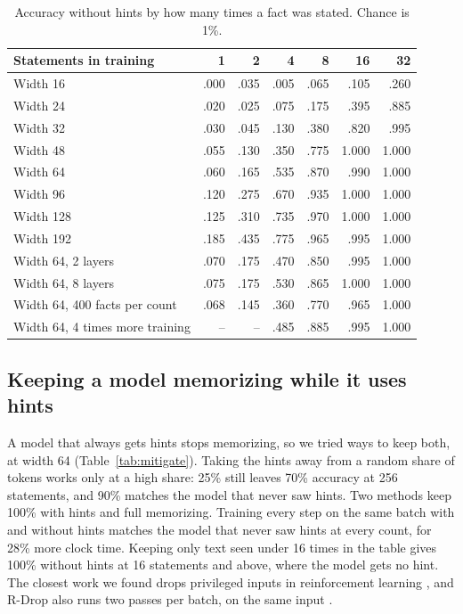 \documentclass[11pt]{article}
\begin{document}
\begin{table}[h]\centering\small
\begin{tabular}{lrrrrrr}\toprule
Statements in training & 1 & 2 & 4 & 8 & 16 & 32\\\midrule
Width 16 & .000 & .035 & .005 & .065 & .105 & .260\\
Width 24 & .020 & .025 & .075 & .175 & .395 & .885\\
Width 32 & .030 & .045 & .130 & .380 & .820 & .995\\
Width 48 & .055 & .130 & .350 & .775 & 1.000 & 1.000\\
Width 64 & .060 & .165 & .535 & .870 & .990 & 1.000\\
Width 96 & .120 & .275 & .670 & .935 & 1.000 & 1.000\\
Width 128 & .125 & .310 & .735 & .970 & 1.000 & 1.000\\
Width 192 & .185 & .435 & .775 & .965 & .995 & 1.000\\
Width 64, 2 layers & .070 & .175 & .470 & .850 & .995 & 1.000\\
Width 64, 8 layers & .075 & .175 & .530 & .865 & 1.000 & 1.000\\
Width 64, 400 facts per count & .068 & .145 & .360 & .770 & .965 & 1.000\\
Width 64, 4 times more training & -- & -- & .485 & .885 & .995 & 1.000\\\bottomrule
\end{tabular}
\caption{Accuracy without hints by how many times a fact was stated. Chance is 1\%.}\label{tab:rare}
\end{table}

\subsection{Keeping a model memorizing while it uses hints}
A model that always gets hints stops memorizing, so we tried ways to keep both, at width 64 (Table~\ref{tab:mitigate}). Taking the hints away from a random share of tokens works only at a high share: 25\% still leaves 70\% accuracy at 256 statements, and 90\% matches the model that never saw hints. Two methods keep 100\% with hints and full memorizing. Training every step on the same batch with and without hints matches the model that never saw hints at every count, for 28\% more clock time. Keeping only text seen under 16 times in the table gives 100\% without hints at 16 statements and above, where the model gets no hint. The closest work we found drops privileged inputs in reinforcement learning \cite{pidropout}, and R-Drop also runs two passes per batch, on the same input \cite{rdrop}.
\end{document}
